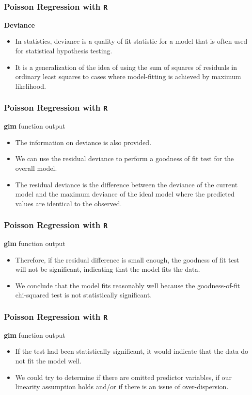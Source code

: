 \documentclass[00-GLMregslides.tex]{subfiles}
\begin{document}
\begin{frame}[fragile]
\frametitle{Poisson Regression with \texttt{R}}
\Large 
\textbf{Deviance}
\begin{itemize}
\item In statistics, deviance is a quality of fit statistic for a model that is often used for statistical 
hypothesis testing. 
\item It is a generalization of the idea of using the sum of squares of 
residuals in ordinary least squares to cases where model-fitting is achieved by maximum likelihood.
\end{itemize}
\end{frame}
\begin{frame}[fragile]
\frametitle{Poisson Regression with \texttt{R}}
\Large 
\textbf{glm} function output
\begin{itemize}
\item The information on deviance is also provided. 
\item We can use the residual deviance to perform a goodness of fit test for the overall model. 
\item The residual deviance is the difference between the deviance of the current model and the maximum deviance of the ideal model where the predicted values are identical to the observed. 
\end{itemize}
\end{frame}
\begin{frame}[fragile]
\frametitle{Poisson Regression with \texttt{R}}
\Large 
\textbf{glm} function output
\begin{itemize}
\item Therefore, if the residual difference is small enough, the goodness of fit test will not be significant, indicating that the model fits the data. 
\item We conclude that the model fits reasonably well because the goodness-of-fit chi-squared test is not statistically significant.

\end{itemize}
\end{frame}
\begin{frame}[fragile]
	\frametitle{Poisson Regression with \texttt{R}}
	\Large 
	\textbf{glm} function output
	\begin{itemize}
\item If the test had been statistically significant, it would indicate that the data do not fit the model well. 
\item We could try to determine if there are omitted predictor variables, if our linearity assumption holds and/or if there is an issue of over-dispersion. 
\end{itemize}
\end{frame}
\end{document}

